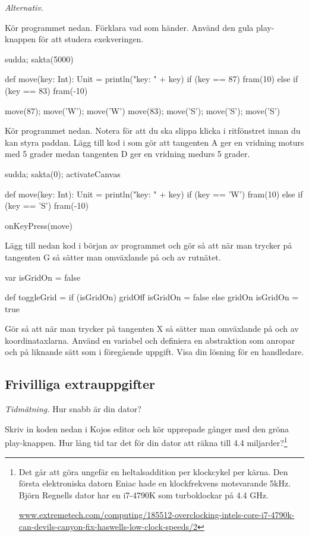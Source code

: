 \Task \emph{Alternativ.}

\Subtask Kör programmet nedan. Förklara vad som händer. Använd den gula play-knappen för att studera exekveringen.

\begin{Code}
sudda; sakta(5000)

def move(key: Int): Unit = {
  println("key: " + key)
  if (key == 87) fram(10) 
  else if (key == 83) fram(-10)  
}

move(87); move('W'); move('W')
move(83); move('S'); move('S'); move('S')
\end{Code}

\Subtask Kör programmet nedan. Notera  för att du ska slippa klicka i ritfönstret innan du kan styra paddan. Lägg till kod i  som gör att tangenten A ger en vridning moturs med 5 grader medan tangenten D ger en vridning medurs 5 grader.

\begin{Code}
sudda; sakta(0); activateCanvas

def move(key: Int): Unit = {
  println("key: " + key)
  if (key == 'W') fram(10) 
  else if (key == 'S') fram(-10)  
}

onKeyPress(move)
\end{Code}

\Subtask Lägg till nedan kod i början av programmet och gör så att när man trycker på tangenten G så  sätter man omväxlande på och av rutnätet. 

\begin{Code}
var isGridOn = false

def toggleGrid = 
  if (isGridOn) {
    gridOff
    isGridOn = false
  } else {
    gridOn
    isGridOn = true  
  }
\end{Code}

\Subtask\Checkpoint Gör så att när man trycker på tangenten X så sätter man omväxlande på och av koordinataxlarna. Använd en variabel  och definiera en abstraktion  som anropar  och  på liknande sätt som i föregående uppgift. Visa din lösning för en handledare.

\subsection{Frivilliga extrauppgifter}

\Task \emph{Tidmätning.} Hur snabb är din dator?

\Subtask \label{task:timer} Skriv in koden nedan i Kojos editor och kör upprepade gånger med den gröna play-knappen. Hur lång tid tar det för din dator att räkna till 4.4 miljarder?\footnote{Det går att göra ungefär en heltalsaddition per klockcykel per kärna. Den första elektroniska datorn Eniac hade en klockfrekvens motsvarande 5kHz. Björn Regnells dator har en i7-4790K som turboklockar på 4.4 GHz.

\href{http://www.extremetech.com/computing/185512-overclocking-intels-core-i7-4790k-can-devils-canyon-fix-haswells-low-clock-speeds/2}{www.extremetech.com/computing/185512-overclocking-intels-core-i7-4790k-can-devils-canyon-fix-haswells-low-clock-speeds/2}
}

